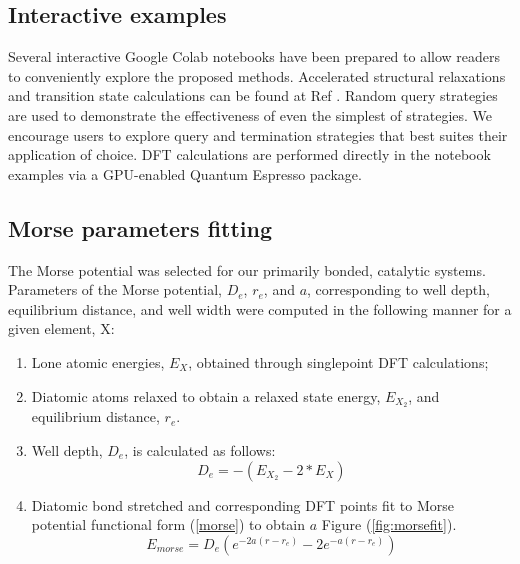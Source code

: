 \documentclass[
 reprint,
 amsmath,amssymb,
 aps,
]{revtex4-1}
\begin{document}
\subsection{Interactive examples}
Several interactive Google Colab notebooks have been prepared to allow readers to conveniently explore the proposed methods. Accelerated structural relaxations and transition state calculations can be found at Ref \cite{examples}. Random query strategies are used to demonstrate the effectiveness of even the simplest of strategies. We encourage users to explore query and termination strategies that best suites their application of choice. DFT calculations are performed directly in the notebook examples via a GPU-enabled Quantum Espresso package.

\subsection{Morse parameters fitting}
The Morse potential was selected for our primarily bonded, catalytic systems. Parameters of the Morse potential, $D_e$, $r_e$, and $a$, corresponding to well depth, equilibrium distance, and well width were computed in the following manner for a given element, X:
\begin{enumerate}
    \item Lone atomic energies, $E_X$, obtained through singlepoint DFT calculations;
    \item Diatomic atoms relaxed to obtain a relaxed state energy, $E_{X_2}$, and equilibrium distance, $r_e$.
    \item Well depth, $D_e$, is calculated as follows:
    \begin{equation}
        D_e = -(E_{X_2} - 2 * E_X)
    \end{equation}
    \item Diatomic bond stretched and corresponding DFT points fit to Morse potential functional form (\ref{morse}) to obtain $a$ Figure (\ref{fig:morsefit}).
    \begin{equation}\label{morse}
    E_{morse} = D_e(e^{-2a(r-r_e)} - 2e^{-a(r-r_e)})
    \end{equation}
\end{enumerate}
 
\end{document}
